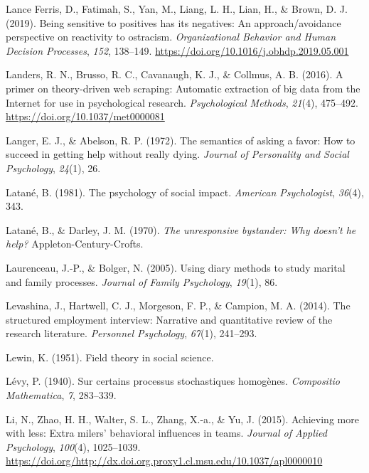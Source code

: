 \documentclass[english,,man]{apa6}
\begin{document}
\leavevmode\hypertarget{ref-lance_ferris_being_2019}{}%
Lance Ferris, D., Fatimah, S., Yan, M., Liang, L. H., Lian, H., \& Brown, D. J. (2019). Being sensitive to positives has its negatives: An approach/avoidance perspective on reactivity to ostracism. \emph{Organizational Behavior and Human Decision Processes}, \emph{152}, 138--149. \url{https://doi.org/10.1016/j.obhdp.2019.05.001}

\leavevmode\hypertarget{ref-landers_primer_2016}{}%
Landers, R. N., Brusso, R. C., Cavanaugh, K. J., \& Collmus, A. B. (2016). A primer on theory-driven web scraping: Automatic extraction of big data from the Internet for use in psychological research. \emph{Psychological Methods}, \emph{21}(4), 475--492. \url{https://doi.org/10.1037/met0000081}

\leavevmode\hypertarget{ref-langer_semantics_1972}{}%
Langer, E. J., \& Abelson, R. P. (1972). The semantics of asking a favor: How to succeed in getting help without really dying. \emph{Journal of Personality and Social Psychology}, \emph{24}(1), 26.

\leavevmode\hypertarget{ref-latane_psychology_1981}{}%
Latané, B. (1981). The psychology of social impact. \emph{American Psychologist}, \emph{36}(4), 343.

\leavevmode\hypertarget{ref-latane_unresponsive_1970}{}%
Latané, B., \& Darley, J. M. (1970). \emph{The unresponsive bystander: Why doesn't he help?} Appleton-Century-Crofts.

\leavevmode\hypertarget{ref-laurenceau_using_2005}{}%
Laurenceau, J.-P., \& Bolger, N. (2005). Using diary methods to study marital and family processes. \emph{Journal of Family Psychology}, \emph{19}(1), 86.

\leavevmode\hypertarget{ref-levashina_structured_2014}{}%
Levashina, J., Hartwell, C. J., Morgeson, F. P., \& Campion, M. A. (2014). The structured employment interview: Narrative and quantitative review of the research literature. \emph{Personnel Psychology}, \emph{67}(1), 241--293.

\leavevmode\hypertarget{ref-lewin_field_1951}{}%
Lewin, K. (1951). Field theory in social science.

\leavevmode\hypertarget{ref-levy_sur_1940}{}%
Lévy, P. (1940). Sur certains processus stochastiques homogènes. \emph{Compositio Mathematica}, \emph{7}, 283--339.

\leavevmode\hypertarget{ref-li_achieving_2015}{}%
Li, N., Zhao, H. H., Walter, S. L., Zhang, X.-a., \& Yu, J. (2015). Achieving more with less: Extra milers' behavioral influences in teams. \emph{Journal of Applied Psychology}, \emph{100}(4), 1025--1039. \url{https://doi.org/http://dx.doi.org.proxy1.cl.msu.edu/10.1037/apl0000010}
\end{document}
